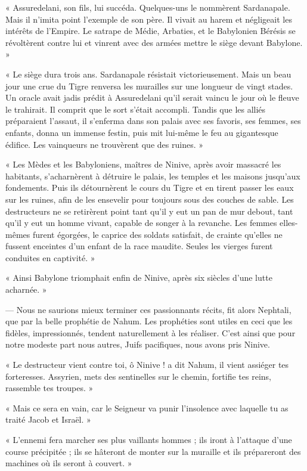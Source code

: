\documentclass[a4paper, 11pt, oneside, polutonikogreek, french]{article}
\begin{document}
« Assuredelani, son fils, lui succéda. Quelques-uns le nommèrent Sardanapale. Mais il n'imita point l'exemple de son père. Il vivait au harem et négligeait les intérêts de l'Empire. Le satrape de Médie, Arbaties, et le Babylonien Bérésis se révoltèrent contre lui et vinrent avec des armées mettre le siège devant Babylone. »

« Le siège dura trois ans. Sardanapale résistait victorieusement. Mais un beau jour une crue du Tigre renversa les murailles sur une longueur de vingt stades. Un oracle avait jadis prédit à Assuredelani qu'il serait vaincu le jour où le fleuve le trahirait. Il comprit que le sort s'était accompli. Tandis que les alliés préparaient l'assaut, il s'enferma dans son palais avec ses favoris, ses femmes, ses enfants, donna un immense festin, puis mit lui-même le feu au gigantesque édifice. Les vainqueurs ne trouvèrent que des ruines. »

« Les Mèdes et les Babyloniens, maîtres de Ninive, après avoir massacré les habitants, s'acharnèrent à détruire le palais, les temples et les maisons jusqu'aux fondements. Puis ils détournèrent le cours du Tigre et en tirent passer les eaux sur les ruines, afin de les ensevelir pour toujours sous des couches de sable. Les destructeurs ne se retirèrent point tant qu'il y eut un pan de mur debout, tant qu'il y eut un homme vivant, capable de songer à la revanche. Les femmes elles-mêmes furent égorgées, le caprice des soldats satisfait, de crainte qu'elles ne fussent enceintes d'un enfant de la race maudite. Seules les vierges furent conduites en captivité. »

« Ainsi Babylone triomphait enfin de Ninive, après six siècles d'une lutte acharnée. »

--- Nous ne saurions mieux terminer ces passionnants récits, fit alors Nephtali, que par la belle prophétie de Nahum. Les prophéties sont utiles en ceci que les fidèles, impressionnés, tendent naturellement à les réaliser. C'est ainsi que pour notre modeste part nous autres, Juifs pacifiques, nous avons pris Ninive.

« Le destructeur vient contre toi, ô Ninive ! a dit Nahum, il vient assiéger tes forteresses. Assyrien, mets des sentinelles sur le chemin, fortifie tes reins, rassemble tes troupes. »

« Mais ce sera en vain, car le Seigneur va punir l'insolence avec laquelle tu as traité Jacob et Israël. »

« L'ennemi fera marcher ses plus vaillants hommes ; ils iront à l'attaque d'une course précipitée ; ils se hâteront de monter sur la muraille et ils prépareront des machines où ils seront à couvert. »
\end{document}
